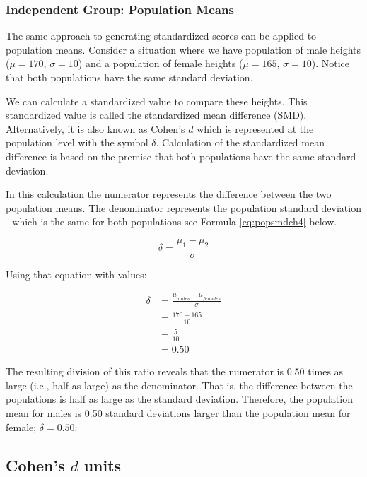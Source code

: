 \documentclass[
]{krantz}
\begin{document}
\hypertarget{independent-group-population-means}{%
\subsubsection{Independent Group: Population Means}\label{independent-group-population-means}}

The same approach to generating standardized scores can be applied to population means. Consider a situation where we have population of male heights (\(\mu = 170\), \(\sigma = 10\)) and a population of female heights (\(\mu = 165\), \(\sigma = 10\)). Notice that both populations have the same standard deviation.

We can calculate a standardized value to compare these heights. This standardized value is called the standardized mean difference (SMD). Alternatively, it is also known as Cohen's \(d\) which is represented at the population level with the symbol \(\delta\). Calculation of the standardized mean difference is based on the premise that both populations have the same standard deviation.

In this calculation the numerator represents the difference between the two population means. The denominator represents the population standard deviation - which is the same for both populations see Formula \eqref{eq:popsmdch4} below.

\begin{equation} 
\delta =  \frac{\mu_{1} - \mu_{2}}{\sigma}
      \label{eq:popsmdch4}
\end{equation}

Using that equation with values:

\[
\begin{aligned} 
\delta &=  \frac{\mu_{males} - \mu_{females}}{\sigma}\\ 
&=  \frac{170 - 165}{10}\\
&=  \frac{5}{10}\\
&= 0.50
\end{aligned} 
\]

The resulting division of this ratio reveals that the numerator is 0.50 times as large (i.e., half as large) as the denominator. That is, the difference between the populations is half as large as the standard deviation. Therefore, the population mean for males is 0.50 standard deviations larger than the population mean for female; \(\delta = 0.50\):

\hypertarget{cohens-d-units}{%
\subsection{\texorpdfstring{Cohen's \(d\) units}{Cohen's d units}}\label{cohens-d-units}}
\end{document}
